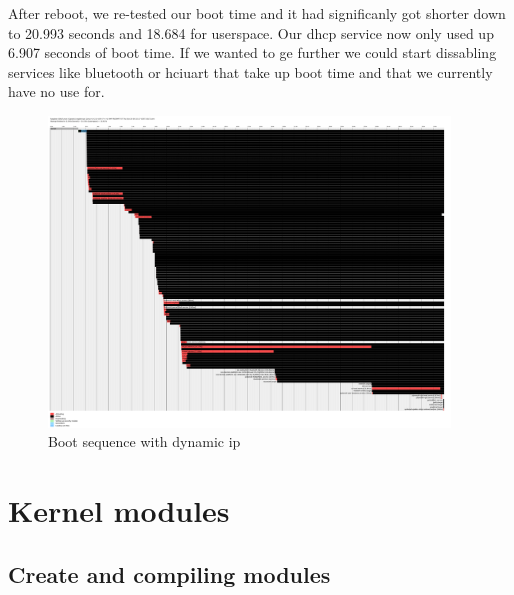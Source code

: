 \documentclass[a4paper,oneside,onecolumn]{article}
\begin{document}
After reboot, we re-tested our boot time and it had significanly got shorter down to 20.993 seconds and 18.684 for userspace. Our dhcp service now only used up 6.907 seconds of boot time. If we wanted to ge further we could start dissabling services like bluetooth or hciuart that take up boot time and that we currently have no use for.
\begin{figure}[htbp]
	\centering
	\includegraphics[width=0.95\textwidth]{resources/bootdyn.png}
	\caption{Boot sequence with dynamic ip}
	\label{fig:label}
\end{figure}

\section{Kernel modules}

\subsection{Create and compiling modules}
\end{document}
